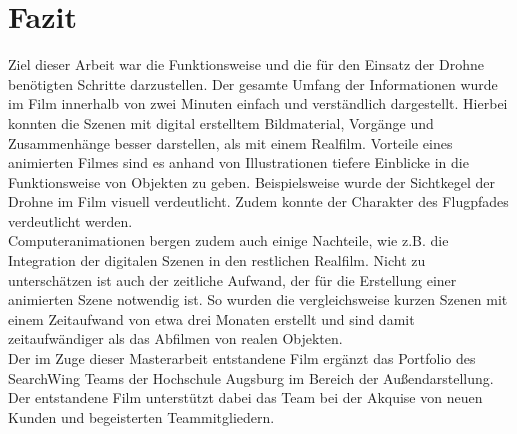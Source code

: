 \chapter{Fazit}

Ziel dieser Arbeit war die Funktionsweise und die für den Einsatz der Drohne benötigten Schritte darzustellen. Der gesamte Umfang der Informationen wurde im Film innerhalb von zwei Minuten einfach und verständlich dargestellt. Hierbei konnten die Szenen mit digital erstelltem Bildmaterial, Vorgänge und Zusammenhänge besser darstellen, als mit einem Realfilm. Vorteile eines animierten Filmes sind es anhand von Illustrationen tiefere Einblicke in die Funktionsweise von Objekten zu geben. Beispielsweise wurde der Sichtkegel der Drohne im Film visuell verdeutlicht. Zudem konnte der Charakter des Flugpfades verdeutlicht werden.\\
Computeranimationen bergen zudem auch einige Nachteile, wie z.B. die Integration der digitalen Szenen in den restlichen Realfilm. Nicht zu unterschätzen ist auch der zeitliche Aufwand, der für die Erstellung einer animierten Szene notwendig ist. So wurden die vergleichsweise kurzen Szenen mit einem Zeitaufwand von etwa drei Monaten erstellt und sind damit zeitaufwändiger als das Abfilmen von realen Objekten.\\
Der im Zuge dieser Masterarbeit entstandene Film ergänzt das Portfolio des SearchWing Teams der Hochschule Augsburg im Bereich der Außendarstellung.
Der entstandene Film unterstützt dabei das Team bei der Akquise von neuen Kunden und begeisterten Teammitgliedern.